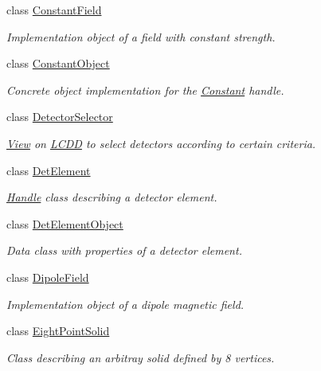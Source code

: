 \begin{DoxyCompactItemize}
class \hyperlink{class_d_d4hep_1_1_geometry_1_1_constant_field}{Constant\+Field}
\begin{DoxyCompactList}\small\item\em Implementation object of a field with constant strength. \end{DoxyCompactList}\item 
class \hyperlink{class_d_d4hep_1_1_geometry_1_1_constant_object}{Constant\+Object}
\begin{DoxyCompactList}\small\item\em Concrete object implementation for the \hyperlink{class_d_d4hep_1_1_geometry_1_1_constant}{Constant} handle. \end{DoxyCompactList}\item 
class \hyperlink{class_d_d4hep_1_1_geometry_1_1_detector_selector}{Detector\+Selector}
\begin{DoxyCompactList}\small\item\em \hyperlink{class_d_d4hep_1_1_view}{View} on \hyperlink{class_d_d4hep_1_1_geometry_1_1_l_c_d_d}{L\+C\+DD} to select detectors according to certain criteria. \end{DoxyCompactList}\item 
class \hyperlink{class_d_d4hep_1_1_geometry_1_1_det_element}{Det\+Element}
\begin{DoxyCompactList}\small\item\em \hyperlink{class_d_d4hep_1_1_handle}{Handle} class describing a detector element. \end{DoxyCompactList}\item 
class \hyperlink{class_d_d4hep_1_1_geometry_1_1_det_element_object}{Det\+Element\+Object}
\begin{DoxyCompactList}\small\item\em Data class with properties of a detector element. \end{DoxyCompactList}\item 
class \hyperlink{class_d_d4hep_1_1_geometry_1_1_dipole_field}{Dipole\+Field}
\begin{DoxyCompactList}\small\item\em Implementation object of a dipole magnetic field. \end{DoxyCompactList}\item 
class \hyperlink{class_d_d4hep_1_1_geometry_1_1_eight_point_solid}{Eight\+Point\+Solid}
\begin{DoxyCompactList}\small\item\em Class describing an arbitray solid defined by 8 vertices. \end{DoxyCompactList}\item 

\end{DoxyCompactItemize}
